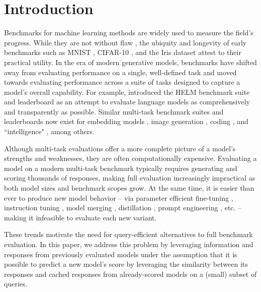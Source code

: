 \section{Introduction}
Benchmarks for machine learning methods are widely used to measure the field’s progress.
While they are not without flaw \citep{pmlr-v97-recht19a}, the ubiquity and longevity of early benchmarks such as MNIST \citep{lecun2010mnist}, CIFAR-10 \citep{Krizhevsky09learningmultiple}, and the Iris dataset \citep{fisher36lda} attest to their practical utility.
In the era of modern generative models, benchmarks have shifted away from evaluating performance on a single, well-defined task and moved towards evaluating performance across a suite of tasks designed to capture a model’s overall capability. 
For example, \citep{liang2022holistic} introduced the HELM benchmark suite and leaderboard as an attempt to evaluate language models as comprehensively and transparently as possible. 
Similar multi-task benchmark suites and leaderboards now exist for embedding models \citep{muennighoff2023mtebmassivetextembedding}, image generation \citep{huang2025t2icompbenchenhancedcomprehensivebenchmark}, coding \citep{chen2021evaluatinglargelanguagemodels}, and ``intelligence" \citep{chollet2019measureintelligence}, among others.

Although multi-task evaluations offer a more complete picture of a model’s strengths and weaknesses, they are often computationally expensive. 
Evaluating a model on a modern multi-task benchmark typically requires generating and scoring thousands of responses, making full evaluation increasingly impractical as both model sizes and benchmark scopes grow. 
At the same time, it is easier than ever to produce new model behavior -- via parameter efficient fine-tuning \citep{han2024parameterefficientfinetuninglargemodels}, instruction tuning \citep{zhang2025instructiontuninglargelanguage}, model merging \citep{model-merging}, distillation \citep{Gou_2021}, prompt engineering \citep{sahoo2025systematicsurveypromptengineering}, etc. -- making it infeasible to evaluate each new variant.

These trends motivate the need for query-efficient alternatives to full benchmark evaluation. 
In this paper, we address this problem by leveraging information and responses from previously evaluated models under the assumption that it is possible to predict a new model’s score by leveraging the similarity between its responses and cached responses from already-scored models on a (small) subset of queries. 

